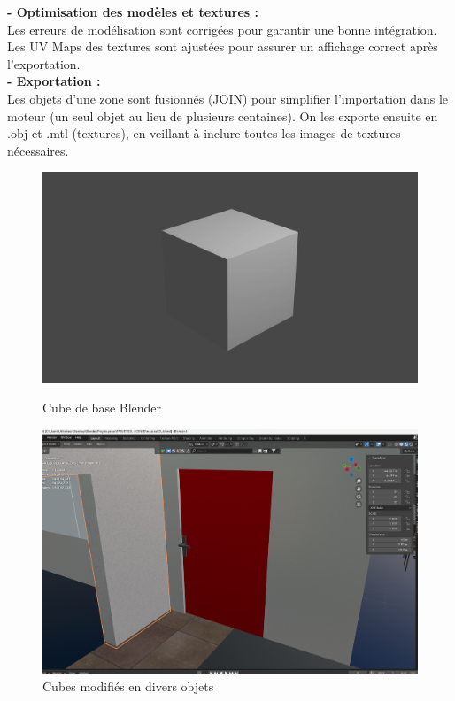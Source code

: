 \textbf{- Optimisation des modèles et textures :} \\

Les erreurs de modélisation sont corrigées pour garantir une
bonne intégration. Les UV Maps des textures sont ajustées pour
assurer un affichage correct après l'exportation.\\

\textbf{- Exportation :} \\

Les objets d’une zone sont fusionnés (JOIN) pour simplifier
l’importation dans le moteur (un seul objet au lieu de plusieurs
centaines). On les exporte ensuite en .obj et .mtl (textures), en
veillant à inclure toutes les images de textures nécessaires.

\begin{figure}
    \centering
    \begin{minipage}{0.49\linewidth}
        \centering
        \includegraphics[width=\linewidth]{images/base_cube.png}
        \caption{Cube de base Blender}
        \label{fig:cube-base}
    \end{minipage}
    \hfill
    \begin{minipage}{0.49\linewidth}
        \centering
        \includegraphics[width=\linewidth]{images/cubemodif.png}
        \caption{Cubes modifiés en divers objets}
        \label{fig:cube-modif}
    \end{minipage}
\end{figure}
